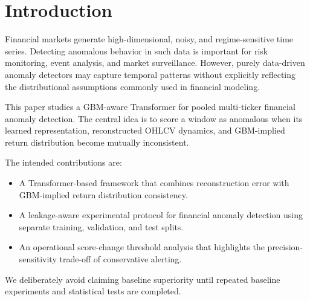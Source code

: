 \section{Introduction}

Financial markets generate high-dimensional, noisy, and regime-sensitive time series. Detecting anomalous behavior in such data is important for risk monitoring, event analysis, and market surveillance. However, purely data-driven anomaly detectors may capture temporal patterns without explicitly reflecting the distributional assumptions commonly used in financial modeling.

This paper studies a GBM-aware Transformer for pooled multi-ticker financial anomaly detection. The central idea is to score a window as anomalous when its learned representation, reconstructed OHLCV dynamics, and GBM-implied return distribution become mutually inconsistent.

The intended contributions are:

\begin{itemize}
  \item A Transformer-based framework that combines reconstruction error with GBM-implied return distribution consistency.
  \item A leakage-aware experimental protocol for financial anomaly detection using separate training, validation, and test splits.
  \item An operational score-change threshold analysis that highlights the precision-sensitivity trade-off of conservative alerting.
\end{itemize}

We deliberately avoid claiming baseline superiority until repeated baseline experiments and statistical tests are completed.

